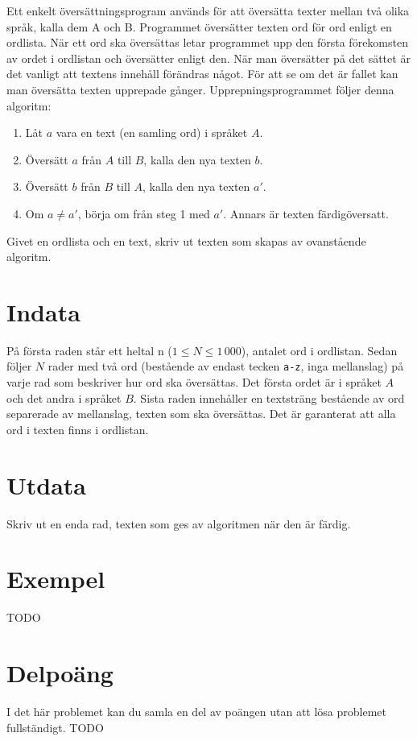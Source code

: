 Ett enkelt översättningsprogram används för att översätta texter mellan två
olika språk, kalla dem A och B. Programmet översätter texten ord för ord enligt
en ordlista. När ett ord ska översättas letar programmet upp den första
förekomsten av ordet i ordlistan och översätter enligt den. När man översätter
på det sättet är det vanligt att textens innehåll förändras något. För att se
om det är fallet kan man översätta texten upprepade gånger. Upprepningsprogrammet
följer denna algoritm:

\begin{enumerate}
    \item Låt $a$ vara en text (en samling ord) i språket $A$.
    \item Översätt $a$ från $A$ till $B$, kalla den nya texten $b$.
    \item Översätt $b$ från $B$ till $A$, kalla den nya texten $a'$.
    \item Om $a \not = a'$, börja om från steg 1 med $a'$. Annars är texten färdigöversatt.
\end{enumerate}

Givet en ordlista och en text, skriv ut texten som skapas av ovanstående algoritm.

\section*{Indata}
På första raden står ett heltal n ($1 \leq N \leq 1\,000$), antalet ord i ordlistan.
Sedan följer $N$ rader med två ord (bestående av endast tecken \texttt{a-z},
inga mellanslag) på varje rad som beskriver hur ord ska översättas. Det första
ordet är i språket $A$ och det andra i språket $B$. Sista raden innehåller en textsträng
bestående av ord separerade av mellanslag, texten som ska översättas. Det är garanterat
att alla ord i texten finns i ordlistan.

\section*{Utdata}
Skriv ut en enda rad, texten som ges av algoritmen när den är färdig.

\section*{Exempel}
TODO

\section*{Delpoäng}
I det här problemet kan du samla en del av poängen utan att lösa problemet fullständigt.
TODO
